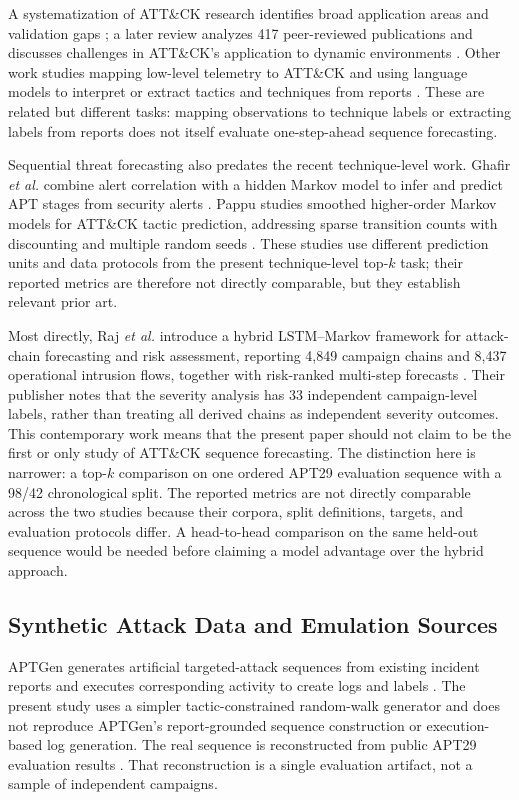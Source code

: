 \documentclass[conference]{IEEEtran}
\begin{document}
A systematization of ATT\&CK research identifies broad application areas and validation gaps \cite{roy2023sok}; a later review analyzes 417 peer-reviewed publications and discusses challenges in ATT\&CK's application to dynamic environments \cite{jiang2025}. Other work studies mapping low-level telemetry to ATT\&CK \cite{lupinacci2026} and using language models to interpret or extract tactics and techniques from reports \cite{fayyazi2024,haque2026}. These are related but different tasks: mapping observations to technique labels or extracting labels from reports does not itself evaluate one-step-ahead sequence forecasting.

Sequential threat forecasting also predates the recent technique-level work. Ghafir \emph{et al.} combine alert correlation with a hidden Markov model to infer and predict APT stages from security alerts \cite{ghafir2019}. Pappu studies smoothed higher-order Markov models for ATT\&CK tactic prediction, addressing sparse transition counts with discounting and multiple random seeds \cite{pappu2025}. These studies use different prediction units and data protocols from the present technique-level top-$k$ task; their reported metrics are therefore not directly comparable, but they establish relevant prior art.

Most directly, Raj \emph{et al.} introduce a hybrid LSTM--Markov framework for attack-chain forecasting and risk assessment, reporting 4,849 campaign chains and 8,437 operational intrusion flows, together with risk-ranked multi-step forecasts \cite{raj2026}. Their publisher notes that the severity analysis has 33 independent campaign-level labels, rather than treating all derived chains as independent severity outcomes. This contemporary work means that the present paper should not claim to be the first or only study of ATT\&CK sequence forecasting. The distinction here is narrower: a top-$k$ comparison on one ordered APT29 evaluation sequence with a 98/42 chronological split. The reported metrics are not directly comparable across the two studies because their corpora, split definitions, targets, and evaluation protocols differ. A head-to-head comparison on the same held-out sequence would be needed before claiming a model advantage over the hybrid approach.

\subsection{Synthetic Attack Data and Emulation Sources}
APTGen generates artificial targeted-attack sequences from existing incident reports and executes corresponding activity to create logs and labels \cite{takahashi2020}. The present study uses a simpler tactic-constrained random-walk generator and does not reproduce APTGen's report-grounded sequence construction or execution-based log generation. The real sequence is reconstructed from public APT29 evaluation results \cite{mitreApt29,shen2024}. That reconstruction is a single evaluation artifact, not a sample of independent campaigns.
\end{document}
